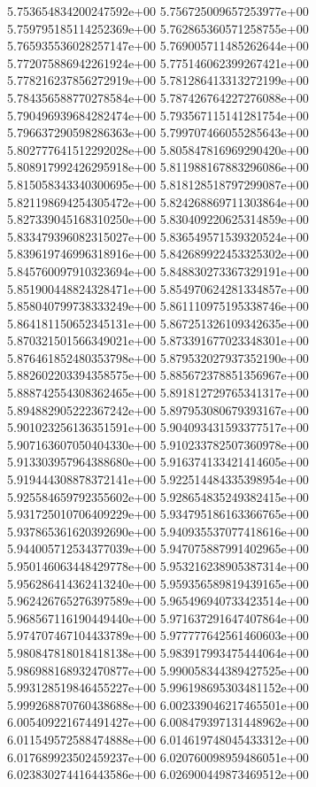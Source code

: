 5.753654834200247592e+00	5.756725009657253977e+00	5.759795185114252369e+00	5.762865360571258755e+00	5.765935536028257147e+00	5.769005711485262644e+00	5.772075886942261924e+00	5.775146062399267421e+00	5.778216237856272919e+00	5.781286413313272199e+00	5.784356588770278584e+00	5.787426764227276088e+00	5.790496939684282474e+00	5.793567115141281754e+00	5.796637290598286363e+00	5.799707466055285643e+00	5.802777641512292028e+00	5.805847816969290420e+00	5.808917992426295918e+00	5.811988167883296086e+00	5.815058343340300695e+00	5.818128518797299087e+00	5.821198694254305472e+00	5.824268869711303864e+00	5.827339045168310250e+00	5.830409220625314859e+00	5.833479396082315027e+00	5.836549571539320524e+00	5.839619746996318916e+00	5.842689922453325302e+00	5.845760097910323694e+00	5.848830273367329191e+00	5.851900448824328471e+00	5.854970624281334857e+00	5.858040799738333249e+00	5.861110975195338746e+00	5.864181150652345131e+00	5.867251326109342635e+00	5.870321501566349021e+00	5.873391677023348301e+00	5.876461852480353798e+00	5.879532027937352190e+00	5.882602203394358575e+00	5.885672378851356967e+00	5.888742554308362465e+00	5.891812729765341317e+00	5.894882905222367242e+00	5.897953080679393167e+00	5.901023256136351591e+00	5.904093431593377517e+00	5.907163607050404330e+00	5.910233782507360978e+00	5.913303957964388680e+00	5.916374133421414605e+00	5.919444308878372141e+00	5.922514484335398954e+00	5.925584659792355602e+00	5.928654835249382415e+00	5.931725010706409229e+00	5.934795186163366765e+00	5.937865361620392690e+00	5.940935537077418616e+00	5.944005712534377039e+00	5.947075887991402965e+00	5.950146063448429778e+00	5.953216238905387314e+00	5.956286414362413240e+00	5.959356589819439165e+00	5.962426765276397589e+00	5.965496940733423514e+00	5.968567116190449440e+00	5.971637291647407864e+00	5.974707467104433789e+00	5.977777642561460603e+00	5.980847818018418138e+00	5.983917993475444064e+00	5.986988168932470877e+00	5.990058344389427525e+00	5.993128519846455227e+00	5.996198695303481152e+00	5.999268870760438688e+00	6.002339046217465501e+00	6.005409221674491427e+00	6.008479397131448962e+00	6.011549572588474888e+00	6.014619748045433312e+00	6.017689923502459237e+00	6.020760098959486051e+00	6.023830274416443586e+00	6.026900449873469512e+00
